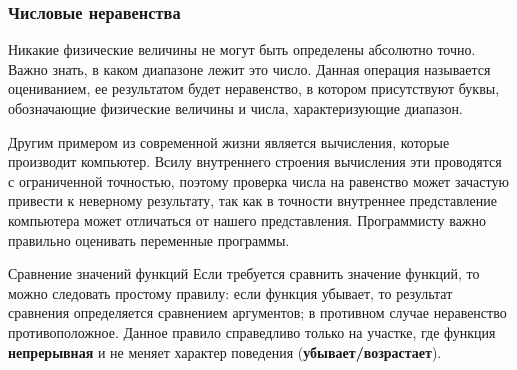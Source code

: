 \documentclass[algebra,twocolumn]{pum}
\date{07.04.20}
\begin{document}
\subsubsection*{Числовые неравенства}
Никакие физические величины не могут быть определены абсолютно точно. Важно знать, в каком диапазоне лежит это число. Данная операция называется оцениванием, ее результатом будет неравенство, в котором присутствуют буквы, обозначающие физические величины и числа, характеризующие диапазон.

Другим примером из современной жизни является вычисления, которые производит компьютер. Всилу внутреннего строения вычисления эти проводятся с ограниченной точностью, поэтому проверка числа на равенство может зачастую привести к неверному результату, так как в точности внутреннее представление компьютера может отличаться от нашего представления. Программисту важно правильно оценивать переменные программы.


\begin{pumbox}{Сравнение значений функций}
  Если требуется сравнить значение функций, то можно следовать простому правилу: если функция убывает, то результат сравнения определяется сравнением аргументов; в противном случае неравенство противоположное. Данное правило справедливо только на участке, где функция {\bf непрерывная} и не меняет характер поведения ({\bf убывает/возрастает}).
\end{pumbox}
\end{document}
